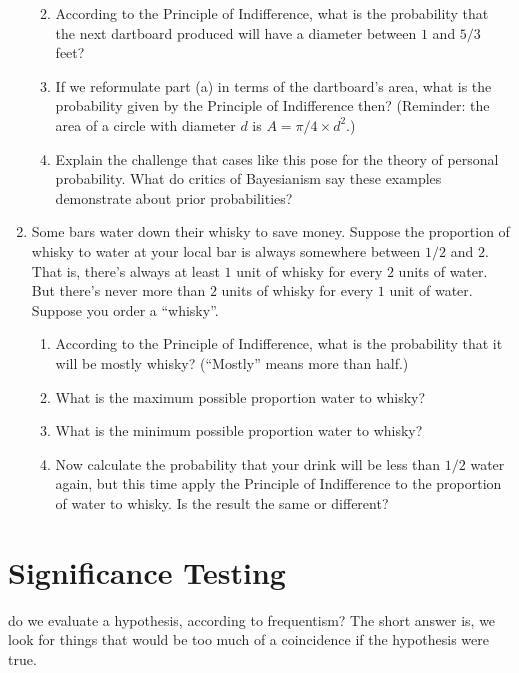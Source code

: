 \documentclass[justified]{tufte-book}
\providecommand{\tightlist}{%
  \setlength{\itemsep}{0pt}\setlength{\parskip}{0pt}}
\theoremstyle{definition}
\theoremstyle{definition}
\theoremstyle{definition}
\theoremstyle{remark}
\begin{document}
\begin{enumerate}
  \begin{enumerate}
  \def\labelenumii{\alph{enumii}.}
  \tightlist
  \item
    According to the Principle of Indifference, what is the probability that the next dartboard produced will have a diameter between \(1\) and \(5/3\) feet?
  \item
    If we reformulate part (a) in terms of the dartboard's area, what is the probability given by the Principle of Indifference then? (Reminder: the area of a circle with diameter \(d\) is \(A = \pi/4 \times d^2\).)
  \item
    Explain the challenge that cases like this pose for the theory of personal probability. What do critics of Bayesianism say these examples demonstrate about prior probabilities?
  \end{enumerate}
\item
  Some bars water down their whisky to save money. Suppose the proportion of whisky to water at your local bar is always somewhere between \(1/2\) and \(2\). That is, there's always at least \(1\) unit of whisky for every \(2\) units of water. But there's never more than \(2\) units of whisky for every \(1\) unit of water. Suppose you order a ``whisky''.

  \begin{enumerate}
  \def\labelenumii{\alph{enumii}.}
  \tightlist
  \item
    According to the Principle of Indifference, what is the probability that it will be mostly whisky? (``Mostly'' means more than half.)
  \item
    What is the maximum possible proportion water to whisky?
  \item
    What is the minimum possible proportion water to whisky?
  \item
    Now calculate the probability that your drink will be less than \(1/2\) water again, but this time apply the Principle of Indifference to the proportion of water to whisky. Is the result the same or different?
  \end{enumerate}
\end{enumerate}

\hypertarget{significance-testing}{%
\chapter{Significance Testing}\label{significance-testing}}

 do we evaluate a hypothesis, according to frequentism? The short answer is, we look for things that would be too much of a coincidence if the hypothesis were true.
\end{document}
